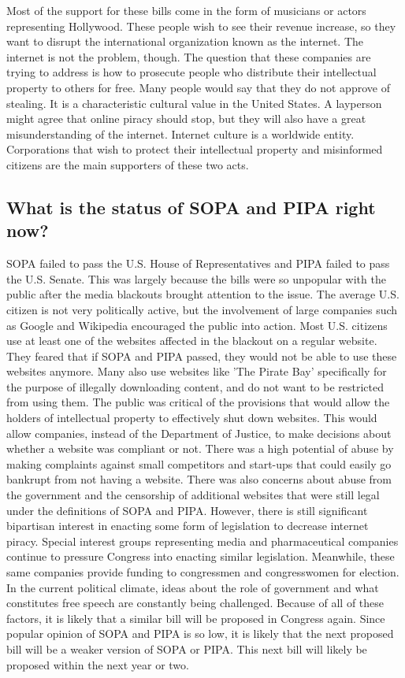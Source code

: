 \documentclass[11pt,journal,compsoc]{IEEEtran}
\begin{document}
\indent Most of the support for these bills come in the form of musicians or actors representing Hollywood. These people wish to see their revenue increase, so they want to disrupt the international organization known as the internet. The internet is not the problem, though. The question that these companies are trying to address is how to prosecute people who distribute their intellectual property to others for free. Many people would say that they do not approve of stealing. It is a characteristic cultural value in the United States. A layperson might agree that online piracy should stop, but they will also have a great misunderstanding of the internet. Internet culture is a worldwide entity. Corporations that wish to protect their intellectual property and misinformed citizens are the main supporters of these two acts.

\subsection{What is the status of SOPA and PIPA right now?}
SOPA failed to pass the U.S. House of Representatives and PIPA failed to pass the U.S. Senate. This was largely because the bills were so unpopular with the public after the media blackouts brought attention to the issue. The average U.S. citizen is not very politically active, but the involvement of large companies such as Google and Wikipedia encouraged the public into action. Most U.S. citizens use at least one of the websites affected in the blackout on a regular website. They feared that if SOPA and PIPA passed, they would not be able to use these websites anymore. Many also use websites like 'The Pirate Bay' specifically for the purpose of illegally downloading content, and do not want to be restricted from using them. The public was critical of the provisions that would allow the holders of intellectual property to effectively shut down websites. This would allow companies, instead of the Department of Justice, to make decisions about whether a website was compliant or not. There was a high potential of abuse by making complaints against small competitors and start-ups that could easily go bankrupt from not having a website. There was also concerns about abuse from the government and the censorship of additional websites that were still legal under the definitions of SOPA and PIPA.
\indent However, there is still significant bipartisan interest in enacting some form of legislation to decrease internet piracy. Special interest groups representing media and pharmaceutical companies continue to pressure Congress into enacting similar legislation. Meanwhile, these same companies provide funding to congressmen and congresswomen for election. In the current political climate, ideas about the role of government and what constitutes free speech are constantly being challenged. Because of all of these factors, it is likely that a similar bill will be proposed in Congress again. Since popular opinion of SOPA and PIPA is so low, it is likely that the next proposed bill will be a weaker version of SOPA or PIPA. This next bill will likely be proposed within the next year or two. 
\end{document}
